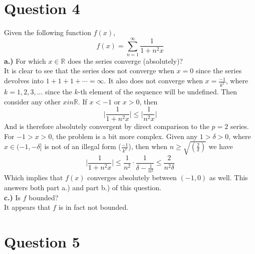\documentclass[12pt, letterpaper]{article}
\begin{document}
\section*{Question 4}
Given the following function $f(x)$,
$$ f(x) = \sum_{n=1}^\infty \frac{1}{1 + n^2x} $$
\noindent\textbf{a.)} For which $x \in \mathbb{R}$ does the series converge (absolutely)?\\

It is clear to see that the series does not converge when $x = 0$ since the series devolves into $1 + 1 + 1 + \cdots = \infty$. It also does not converge when $x = \frac{-1}{k^2}$, where $k = 1, 2, 3, ...$ since the $k$-th element of the sequence will be undefined. Then consider any other $x in \mathbb{R}$. If $x < -1$ or $x > 0$, then
$$ \Big|\frac{1}{1+n^2x}\Big| \leq \Big|\frac{1}{n^2x}\Big| $$
And is therefore absolutely convergent by direct comparison to the $p=2$ series. For $-1 > x > 0$, the problem is a bit more complex. Given any $1 > \delta > 0$, where $x \in (-1, -\delta]$ is not of an illegal form ($\frac{-1}{k^2}$), then when $n \geq \sqrt{(\frac{2}{\delta})}$ we have
$$ \Big|\frac{1}{1+n^2x}\Big| \leq \frac{1}{n^2} \cdot \frac{1}{\delta - \frac{1}{n^2}} \leq \frac{2}{n^2\delta}$$
Which implies that $f(x)$ converges absolutely between $(-1, 0)$ as well. This answers both part a.) and part b.) of this question.\\

\noindent\textbf{c.)} Is $f$ bounded?\\

It appears that $f$ is in fact not bounded. 

\section*{Question 5}
\end{document}

